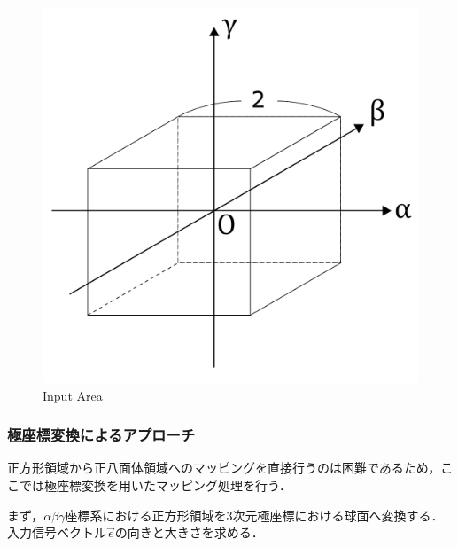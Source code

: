 \begin{figure}[h]
  \centering
  \includegraphics[width=80truemm, clip]{images/input.pdf}
  \caption{Input Area}
  \label{fig:input}
\end{figure}

\subsubsection{極座標変換によるアプローチ}

正方形領域から正八面体領域へのマッピングを直接行うのは困難であるため，ここでは極座標変換を用いたマッピング処理を行う．

まず，$\alpha\beta\gamma$座標系における正方形領域を3次元極座標における球面へ変換する．
入力信号ベクトル$\vec{\epsilon}$の向きと大きさを求める．